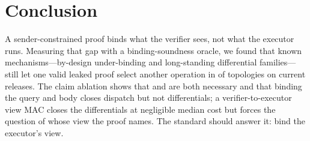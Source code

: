 \section{Conclusion}\label{sec:conclusion}

A sender-constrained proof binds what the verifier sees, not what the executor
runs. Measuring that gap with a binding-soundness oracle, we found that known
mechanisms---by-design under-binding and long-standing differential
families---still let one valid leaked proof select another operation in
\NumVulnTopologies{} of \NumTopologies{} topologies on current releases. The
claim ablation shows that \htm and \htu are both necessary and that binding
the query and body closes dispatch but not differentials; a verifier-to-executor
view MAC closes the differentials at negligible median cost but forces the
question of whose view the proof names. The standard should answer it: bind
the executor's view.
